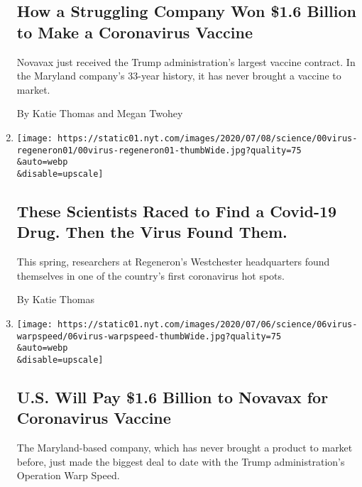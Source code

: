 \begin{enumerate}
  \hypertarget{how-a-struggling-company-won-16-billion-to-make-a-coronavirus-vaccine}{%
  \subsection{How a Struggling Company Won \$1.6 Billion to Make a
  Coronavirus
  Vaccine}\label{how-a-struggling-company-won-16-billion-to-make-a-coronavirus-vaccine}}

  Novavax just received the Trump administration's largest vaccine
  contract. In the Maryland company's 33-year history, it has never
  brought a vaccine to market.

  By Katie Thomas and Megan Twohey
\item
  \href{/2020/07/09/health/regeneron-monoclonal-antibodies.html}{}

  \texttt{[image: https://static01.nyt.com/images/2020/07/08/science/00virus-regeneron01/00virus-regeneron01-thumbWide.jpg?quality=75\\\&auto=webp\\\&disable=upscale]}

  \hypertarget{these-scientists-raced-to-find-a-covid-19-drug-then-the-virus-found-them}{%
  \subsection{These Scientists Raced to Find a Covid-19 Drug. Then the
  Virus Found
  Them.}\label{these-scientists-raced-to-find-a-covid-19-drug-then-the-virus-found-them}}

  This spring, researchers at Regeneron's Westchester headquarters found
  themselves in one of the country's first coronavirus hot spots.

  By Katie Thomas
\item
  \href{/2020/07/07/health/novavax-coronavirus-vaccine-warp-speed.html}{}

  \texttt{[image: https://static01.nyt.com/images/2020/07/06/science/06virus-warpspeed/06virus-warpspeed-thumbWide.jpg?quality=75\\\&auto=webp\\\&disable=upscale]}

  \hypertarget{us-will-pay-16-billion-to-novavax-for-coronavirus-vaccine}{%
  \subsection{U.S. Will Pay \$1.6 Billion to Novavax for Coronavirus
  Vaccine}\label{us-will-pay-16-billion-to-novavax-for-coronavirus-vaccine}}

  The Maryland-based company, which has never brought a product to
  market before, just made the biggest deal to date with the Trump
  administration's Operation Warp Speed.


\end{enumerate}
